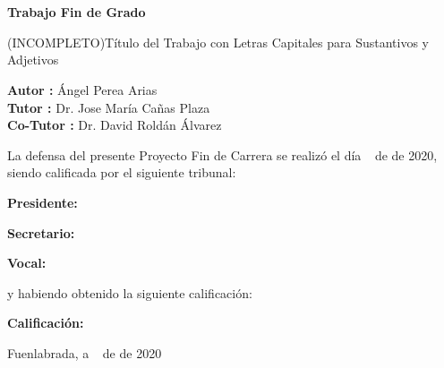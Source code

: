 \documentclass[a4paper, 12pt]{book}
\begin{document}
	\newpage
	\mbox{}
	\thispagestyle{empty} %
	
	
	\clearpage
	\chapter*{}
	
	\vspace{-4cm}
	\begin{center}
		\LARGE
		\textbf{Trabajo Fin de Grado}
		
		\vspace{1cm}
		\large
		(INCOMPLETO)Título del Trabajo con Letras Capitales para Sustantivos y Adjetivos
		
		\vspace{1cm}
		\large
		\textbf{Autor :} Ángel Perea Arias \\
		\textbf{Tutor :} Dr. Jose María Cañas Plaza \\
		\textbf{Co-Tutor :} Dr. David Roldán Álvarez		
		
	\end{center}
	
	\vspace{1cm}
	La defensa del presente Proyecto Fin de Carrera se realizó el día \qquad$\;\,$ de \qquad\qquad\qquad\qquad \newline de 2020, siendo calificada por el siguiente tribunal:
	
	
	\vspace{0.5cm}
	\textbf{Presidente: }
	
	\vspace{1.2cm}
	\textbf{Secretario: }
	
	\vspace{1.2cm}
	\textbf{Vocal: }
	
	
	\vspace{1.2cm}
	y habiendo obtenido la siguiente calificación:
	
	\vspace{1cm}
	\textbf{Calificación:}
	
	
	\vspace{1cm}
	\begin{flushright}
		Fuenlabrada, a \qquad$\;\,$ de \qquad\qquad\qquad\qquad de 2020
	\end{flushright}
	
	
\end{document}
